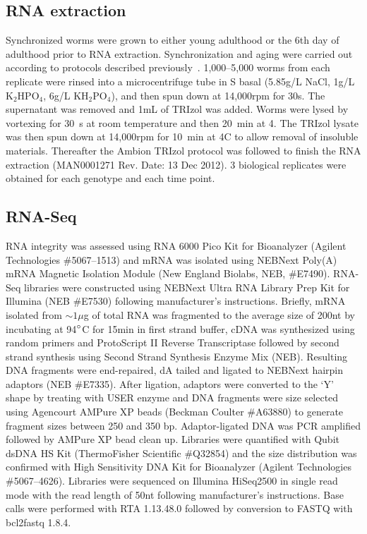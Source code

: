 \documentclass[10pt,letterpaper,twocolumn]{article}
\begin{document}
\subsection*{RNA extraction}
\label{sb:rna_extraction}
Synchronized worms were grown to either young adulthood or the 6th day of
adulthood prior to RNA extraction. Synchronization and aging were carried out
according to protocols described previously~\cite{Leighton2014}. 1,000--5,000
worms from each replicate were rinsed into a microcentrifuge tube in S basal
(5.85g/L NaCl, 1g/L $\mathrm{K}_2\mathrm{HPO}_4$, 6g/L
$\mathrm{KH}_2\mathrm{PO}_4$), and then spun down at 14,000rpm for 30s. The
supernatant was removed and 1mL of TRIzol was added. Worms were lysed by
vortexing for 30~s at room temperature and then 20~min at 4\degree. The TRIzol
lysate was then spun down at 14,000rpm for 10~min at 4\degree{}C to allow
removal of insoluble materials. Thereafter the Ambion TRIzol protocol was
followed to finish the RNA extraction (MAN0001271 Rev. Date: 13 Dec 2012).
3 biological replicates were obtained for each genotype and each time point.

\subsection*{RNA-Seq}
\label{sb:rna_seq}
RNA integrity was assessed using RNA 6000 Pico Kit for Bioanalyzer (Agilent
Technologies \#5067--1513) and mRNA was isolated using NEBNext Poly(A) mRNA
Magnetic Isolation Module (New England Biolabs, NEB, \#E7490). RNA-Seq libraries
were constructed using NEBNext Ultra RNA Library Prep Kit for Illumina (NEB
\#E7530) following manufacturer’s instructions. Briefly, mRNA isolated from
$\sim1\mu$g of total RNA was fragmented to the average size of 200nt by
incubating at 94$\degree$C for 15min in first strand buffer, cDNA was synthesized
using random primers and ProtoScript II Reverse Transcriptase followed by
second strand synthesis using Second Strand Synthesis Enzyme Mix (NEB).
Resulting DNA fragments were end-repaired, dA tailed and ligated to NEBNext
hairpin adaptors (NEB \#E7335).
After ligation, adaptors were converted to the ‘Y’ shape by treating with USER
enzyme and DNA fragments were size selected using Agencourt AMPure XP beads
(Beckman Coulter \#A63880) to generate fragment sizes between 250 and 350 bp.
Adaptor-ligated DNA was PCR amplified followed by AMPure XP bead clean up.
Libraries were quantified with Qubit dsDNA HS Kit (ThermoFisher Scientific
\#Q32854) and the size distribution was confirmed with High Sensitivity DNA Kit
for Bioanalyzer (Agilent Technologies \#5067--4626).
Libraries were sequenced on Illumina HiSeq2500 in single read mode with the read
length of 50nt following manufacturer's instructions. Base calls were performed
with RTA 1.13.48.0 followed by conversion to FASTQ with bcl2fastq 1.8.4.
\end{document}

